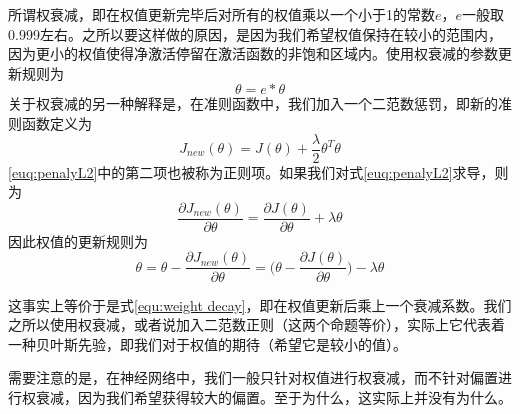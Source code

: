 所谓权衰减，即在权值更新完毕后对所有的权值乘以一个小于1的常数$e$，$e$一般取0.999左右。之所以要这样做的原因，是因为我们希望权值保持在较小的范围内，因为更小的权值使得净激活停留在激活函数的非饱和区域内。使用权衰减的参数更新规则为
\begin{equation}
\theta = e*\theta
\label{equ:weight decay}
\end{equation}
关于权衰减的另一种解释是，在准则函数中，我们加入一个二范数惩罚，即新的准则函数定义为
\begin{equation}
J_{new}(\theta) = J(\theta) + \frac{\lambda}{2} \theta^T\theta
\label{euq:penalyL2}
\end{equation}
\eqref{euq:penalyL2}中的第二项也被称为正则项。如果我们对式\eqref{euq:penalyL2}求导，则为
\begin{equation}
\frac{\partial J_{new}(\theta)}{ \partial \theta} = \frac{\partial J(\theta)}{ \partial \theta} + \lambda \theta
\end{equation}
因此权值的更新规则为
\begin{equation}
\theta = \theta - \frac{\partial J_{new}(\theta)}{ \partial \theta} = \bigg(\theta -  \frac{\partial J(\theta)}{ \partial \theta}\bigg) - \lambda \theta
\end{equation}

这事实上等价于是式\ref{equ:weight decay}，即在权值更新后乘上一个衰减系数。我们之所以使用权衰减，或者说加入二范数正则（这两个命题等价），实际上它代表着一种贝叶斯先验，即我们对于权值的期待（希望它是较小的值）。

需要注意的是，在神经网络中，我们一般只针对权值进行权衰减，而不针对偏置进行权衰减，因为我们希望获得较大的偏置。至于为什么，这实际上并没有为什么。


